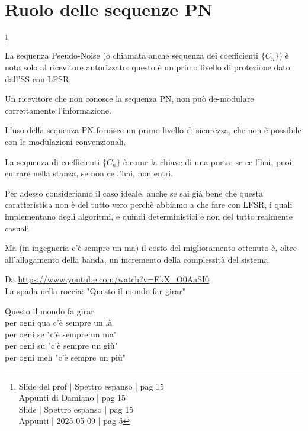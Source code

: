 \newpage 

\section{Ruolo delle sequenze PN}
\footnote{Slide del prof | Spettro espanso | pag 15 \\
Appunti di Damiano | pag 15 \\ 
Slide | Spettro espanso | pag 15 \\
Appunti | 2025-05-09 | pag 5
} 

La sequenza Pseudo-Noise (o chiamata anche sequenza dei coefficienti $\{  C_n \}$) 
è nota solo al ricevitore autorizzato: 
questo è un primo livello di protezione dato dall'SS con LFSR. \newline 

Un ricevitore che non conosce la sequenza PN, 
non può de-modulare correttamente l'informazione. \newline 

L'uso della sequenza PN fornisce un primo livello di sicurezza, 
che non è possibile con le modulazioni convenzionali. \newline 

\begin{tcolorbox}
    La sequenza di coefficienti $\{ C_n\}$ è come la chiave di una porta: 
    se ce l'hai, puoi entrare nella stanza, se non ce l'hai, non entri. \newline 

    Per adesso consideriamo il caso ideale, 
    anche se sai già bene che questa caratteristica non è del tutto vero perchè abbiamo a che fare con LFSR, 
    i quali implementano degli algoritmi, e quindi deterministici e non del tutto realmente casuali
\end{tcolorbox}

Ma (in ingegneria c'è sempre un ma) il costo del miglioramento ottenuto è, 
oltre all'allagamento della banda, 
un incremento della complessità del sistema. \newline 

\begin{tcolorbox}
    
    Da \url{https://www.youtube.com/watch?v=EkX_O0AaSI0} \\
    La spada nella roccia: "Questo il mondo far girar" \newline    
    
    Questo il mondo fa girar \\
    per ogni qua c'è sempre un là\\
    per ogni se "c'è sempre un ma"\\
    per ogni su "c'è sempre un giù"\\
    per ogni meh "c'è sempre un più"
\end{tcolorbox}

